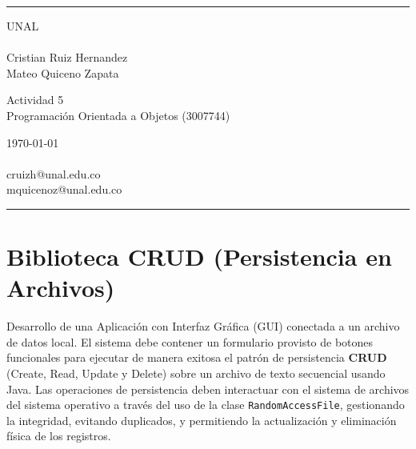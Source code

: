 \documentclass[a4paper]{article} %
\begin{document}

\fancyhead[C]{}
\hrule \medskip %
\begin{minipage}{0.295\textwidth} %
\raggedright
UNAL\\ %
\footnotesize %
\hfill\\
Cristian Ruiz Hernandez\\
Mateo Quiceno Zapata
\end{minipage}
\begin{minipage}{0.4\textwidth} %
\centering 
\large %
Actividad 5\\ %
\normalsize %
Programación Orientada a Objetos (3007744)\\ %
\end{minipage}
\begin{minipage}{0.295\textwidth} %
\raggedleft
\today\\ %
\footnotesize %
\hfill\\
cruizh@unal.edu.co\\
mquicenoz@unal.edu.co
\end{minipage}
\medskip\hrule %
\bigskip


\section{Biblioteca CRUD (Persistencia en Archivos)}
Desarrollo de una Aplicación con Interfaz Gráfica (GUI) conectada a un archivo de datos local. El sistema debe contener un formulario provisto de botones funcionales para ejecutar de manera exitosa el patrón de persistencia \textbf{CRUD} (Create, Read, Update y Delete) sobre un archivo de texto secuencial usando Java. Las operaciones de persistencia deben interactuar con el sistema de archivos del sistema operativo a través del uso de la clase \texttt{RandomAccessFile}, gestionando la integridad, evitando duplicados, y permitiendo la actualización y eliminación física de los registros.
\end{document}
